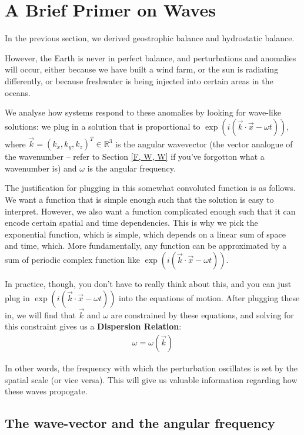 \section{A Brief Primer on Waves}

In the previous section, we derived geostrophic balance and  hydrostatic balance.

However, the Earth is never in perfect balance, and perturbations and anomalies will occur, either because we have built a wind farm, or the sun is radiating differently, or because freshwater is being injected into certain areas in the oceans.

We analyse how systems respond to these anomalies by looking for wave-like solutions: we plug in a solution that is proportional to $\exp(i(\vec{k}\cdot\vec{x}-\omega t))$, where $\vec{k}=(k_x,k_y,k_z)^T\in\mathbb{R}^3$ is the angular wavevector (the vector analogue of the wavenumber – refer to Section \ref{F, W, W} if you've forgotton what a wavenumber is) and $\omega$ is the angular frequency.

The justification for plugging in this somewhat convoluted function is as follows. We want a function that is simple enough such that the solution is easy to interpret. However, we also want a function complicated enough such that it can encode certain spatial and time dependencies. This is why we pick the exponential function, which is simple, which depends on a linear sum of space and time, which. More fundamentally, any function can be approximated by a sum of periodic complex function like $\exp(i(\vec{k}\cdot\vec{x}-\omega t))$.

In practice, though, you don't have to really think about this, and you can just plug in $\exp(i(\vec{k}\cdot\vec{x}-\omega t))$ into the equations of motion. After plugging these in, we will find that $\vec{k}$ and $\omega$ are constrained by these equations, and solving for this constraint gives us a \textbf{Dispersion Relation}:
\begin{align*}
    \omega=\omega(\vec{k})
\end{align*}

In other words, the frequency with which the perturbation oscillates is set by the spatial scale (or vice versa). This will give us valuable information regarding how these waves propogate.

\subsection{The wave-vector and the angular frequency}

